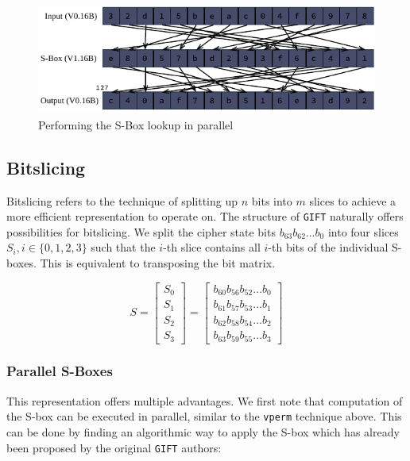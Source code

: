 \documentclass[12pt]{report}
\begin{document}
\begin{figure}[h!]
    \centering
    \includegraphics[width=\textwidth]{Figures/tbl_example.pdf}
    \caption{Performing the S-Box lookup in parallel}
\end{figure}

\subsection{Bitslicing}

Bitslicing refers to the technique of splitting up $n$ bits into $m$ slices to
achieve a more efficient representation to operate on. The structure of
\texttt{GIFT} naturally offers possibilities for bitslicing. We split the
cipher state bits $b_{63}b_{62}\dots b_0$ into four slices $S_i,
i\in\{0,1,2,3\}$ such that the $i$-th slice contains all $i$-th bits of the
individual S-boxes. This is equivalent to transposing the bit matrix.

\[
    S=\begin{bmatrix}
        S_0\\
        S_1\\
        S_2\\
        S_3
    \end{bmatrix}
    =\begin{bmatrix}
        b_{60}b_{56}b_{52}\dots b_0\\
        b_{61}b_{57}b_{53}\dots b_1\\
        b_{62}b_{58}b_{54}\dots b_2\\
        b_{63}b_{59}b_{55}\dots b_3
    \end{bmatrix}
\]

\subsubsection{Parallel S-Boxes}

This representation offers multiple advantages. We first note that computation
of the S-box can be executed in parallel, similar to the \texttt{vperm}
technique above. This can be done by finding an algorithmic way to apply the
S-box which has already been proposed by the original \texttt{GIFT} authors:
\end{document}
